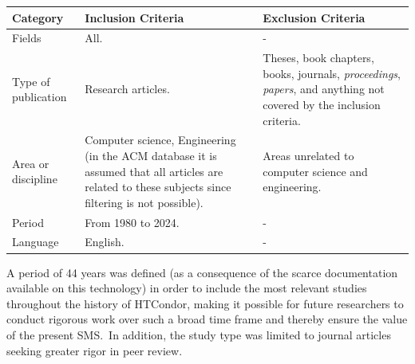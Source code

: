 \begin{table}
	{\begin{tabular}{p{2.7cm}p{5cm}p{5cm}} \toprule
			\textbf{Category}   & \textbf{Inclusion Criteria}                                                                                                                        & \textbf{Exclusion Criteria}                                                                                                        \\
			\midrule
			Fields              & All.                                                                                                                                               & -                                                                                                                                  \\
			Type of publication & Research articles.                                                                                                                                 & Theses, book chapters, books, journals, \textit{proceedings}, \textit{papers}, and anything not covered by the inclusion criteria. \\
			Area or discipline  & Computer science, Engineering (in the ACM database it is assumed that all articles are related to these subjects since filtering is not possible). & Areas unrelated to computer science and engineering.                                                                               \\
			Period              & From 1980 to 2024.                                                                                                                                 & -                                                                                                                                  \\
			Language            & English.                                                                                                                                           & -                                                                                                                                  \\
			\bottomrule
		\end{tabular}}
	\label{table:Criteria}
\end{table}

A period of 44 years was defined (as a consequence of the scarce documentation available on this technology) in order to include the most relevant studies throughout the history of HTCondor, making it possible for future researchers to conduct rigorous work over such a broad time frame and thereby ensure the value of the present SMS.~In addition, the study type was limited to journal articles seeking greater rigor in peer review.


